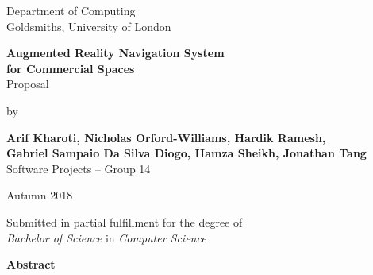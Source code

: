 \documentclass[12pt]{report}
\newcommand\blankpage{%
    \null
    \thispagestyle{empty}%
    \addtocounter{page}{-1}%
    \newpage}
\begin{document}
\begin{titlepage}
    \begin{center}
        \vspace*{1cm}
        Department of Computing\\
        Goldsmiths, University of London\\

        \vspace*{3.25cm}

        \textbf{\LARGE Augmented Reality Navigation System\\}
        \vspace*{0.20cm}           
        \textbf{\LARGE for Commercial Spaces}\\
        \vspace*{0.55cm}           
        {\large Proposal}\\
        \vspace*{0.15cm}           

        \vspace*{2cm}
        by\\
        \vspace*{0.25cm}   

        \textbf{Arif Kharoti, Nicholas Orford-Williams, Hardik Ramesh,\\}
        \textbf{Gabriel Sampaio Da Silva Diogo, Hamza Sheikh, Jonathan Tang\\}
        \vspace*{0.1cm}    
        Software Projects – Group 14\\  

        \vspace{2cm}

        Autumn 2018
        \vfill

        Submitted in partial fulfillment for the degree of\\
        \textit{Bachelor of Science} in \textit{Computer Science}

        \vspace{1.5cm}

    \end{center}
\end{titlepage}
\afterpage{\blankpage}

\thispagestyle{plain}

\begin{center}        
    \large
    \textbf{Abstract}\\
\end{center}
\end{document}
